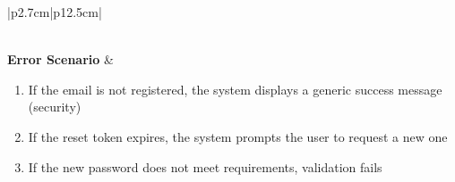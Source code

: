 \begin{table}[H]
\begin{tabular}{|p{2.7cm}|p{12.5cm}|}
\begin{minipage}[t]{\linewidth}
\begin{enumerate}[topsep=0pt,itemsep=1pt,parsep=0pt,partopsep=0pt]
                                      \end{enumerate}
                                  \end{minipage}              \\
        \hline
        \textbf{Error Scenario} & \begin{minipage}[t]{\linewidth}
                                      \begin{enumerate}[topsep=0pt,itemsep=1pt,parsep=0pt,partopsep=0pt]
                                          \item If the email is not registered, the system displays a generic success message
                                                (security)
                                          \item If the reset token expires, the system prompts the user to request a new one
                                          \item If the new password does not meet requirements, validation fails
                                      \end{enumerate}
                                  \end{minipage} \\
        \hline
    \end{tabular}
    \label{tab:guest-reset-pw}
\end{table}
